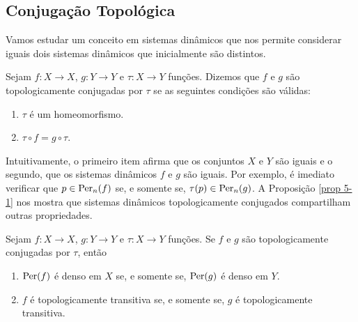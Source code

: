 \subsection{Conjugação Topológica}

Vamos estudar um conceito em sistemas dinâmicos que nos permite considerar iguais dois sistemas dinâmicos que inicialmente são distintos.

\begin{definition}
Sejam $f: X \to X$, $g: Y \to Y$ e $\tau: X \to Y$ funções. Dizemos que $f$ e $g$ são topologicamente conjugadas por $\tau$ se as seguintes condições são válidas:
\begin{enumerate}[label=\roman*.]
\item $\tau$ é um homeomorfismo.
\item $\tau \circ f = g \circ \tau$.
\end{enumerate}
\end{definition}

Intuitivamente, o primeiro item afirma que os conjuntos $X$ e $Y$ são iguais e o segundo, que os sistemas dinâmicos $f$ e $g$ são iguais. Por exemplo, é imediato verificar que $p \in \operatorname{Per}_n(f)$ se, e somente se, $\tau(p) \in \operatorname{Per}_n(g)$. A Proposição \ref{prop 5-1} nos mostra que sistemas dinâmicos topologicamente conjugados compartilham outras propriedades.

\begin{proposition}\label{prop 5-1}
Sejam $f: X \to X$, $g: Y \to Y$ e $\tau: X \to Y$ funções. Se $f$ e $g$ são topologicamente conjugadas por $\tau$, então
\begin{enumerate}
\item $\operatorname{Per}(f)$ é denso em $X$ se, e somente se, $\operatorname{Per}(g)$ é denso em $Y$.
\item $f$ é topologicamente transitiva se, e somente se, $g$ é topologicamente transitiva.
\end{enumerate}
\end{proposition}

